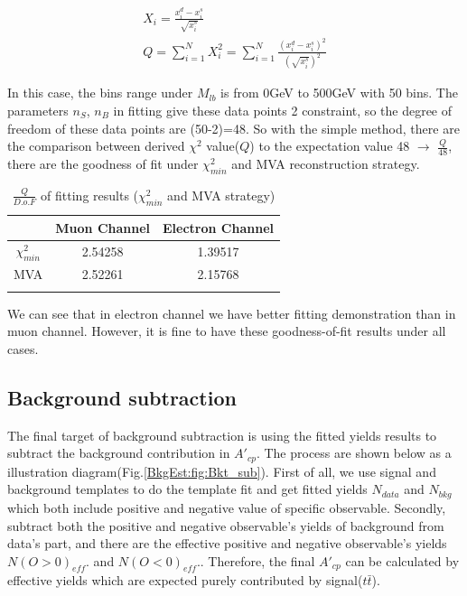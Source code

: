 		\begin{equation}
		\begin{split}
		X_i = \frac{x^d_i - x^s_i}{\sqrt{x^s_i}} \\
		Q = \sum_{i=1}^{N} X_i^2 = \sum_{i=1}^{N} \frac{(x^d_i - x^s_i)^2}{(\sqrt{x^s_i})^2}
		\label{eq:chi2_dis_this}
		\end{split}
		\end{equation}

		In this case, the bins range under $M_{lb}$ is from 0GeV to 500GeV with 50 bins. The parameters $n_S$, $n_B$ in fitting give these data points 2 constraint, so the degree of freedom of these data points are (50-2)=48. So with the simple method, there are the comparison between derived $\chi^2$ value($Q$) to the expectation value 48 $\longrightarrow$ $\frac{Q}{48}$, there are the goodness of fit under $\chi^2_{min}$ and MVA reconstruction strategy.

		\begin{center}
		\begin{longtable}[H]{ c c c }
		\caption{$\frac{Q}{D.o.F}$ of fitting results ($\chi^2_{min}$ and MVA strategy)} \\
		\hline
		 & Muon Channel & Electron Channel \\ 
		\hline
		$\chi^2_{min}$ & 2.54258 & 1.39517 \\
		MVA & 2.52261 & 2.15768 \\
		\hline
		\label{BkgEst:tb:goodness_of_fit}
		\end{longtable}
		\end{center}
		\FloatBarrier

		We can see that in electron channel we have better fitting demonstration than in muon channel. However, it is fine to have these goodness-of-fit results under all cases.

	\subsection{Background subtraction}
	\label{ssec:bkg_sub}

		The final target of background subtraction is using the fitted yields results to subtract the background contribution in $A'_{cp}$. The process are shown below as a illustration diagram(Fig.\ref{BkgEst:fig:Bkt_sub}). First of all, we use signal and background templates to do the template fit and get fitted yields $N_{data}$ and $N_{bkg}$ which both include positive and negative value of specific observable. Secondly, subtract both the positive and negative observable's yields of background from data's part, and there are the effective positive and negative observable's yields $N(O>0)_{eff}.$ and $N(O<0)_{eff}.$. Therefore, the final $A'_{cp}$ can be calculated by effective yields which are expected purely contributed by signal($t\bar{t}$).

